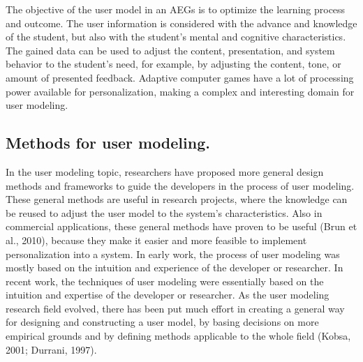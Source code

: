 The objective of the user model in an AEGs is to optimize the learning process
and outcome.   The user information is considered with the advance and knowledge
of the student, but also with the  student’s mental and cognitive
characteristics. The gained data can be used to adjust the content,
presentation, and system behavior to the  student’s need, for example, by
adjusting the content, tone, or amount of presented feedback. Adaptive computer
games have a lot of processing power available for personalization,  making a
complex and interesting domain for user modeling.

\subsection{Methods for user modeling.} 

In the user modeling topic, researchers have proposed more general design
methods and frameworks to guide the developers in the process of user modeling.
These general methods are useful in research projects, where the knowledge can
be reused to adjust the user model to the system’s characteristics. Also in
commercial applications,  these general methods have proven to be useful (Brun
et al., 2010), because they make it easier and more feasible to implement
personalization into a system. In early work, the process of user modeling was
mostly based on the intuition and experience of the developer or researcher. In
recent work, the techniques of user modeling were essentially based on the
intuition and expertise of the developer or researcher. As the user modeling
research field evolved, there has been put much effort in creating a general way
for designing and constructing a user model, by basing decisions on more
empirical grounds and by defining methods applicable to the whole field (Kobsa,
2001; Durrani, 1997).

